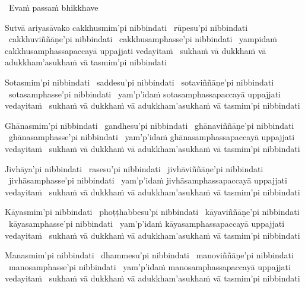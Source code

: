 \begin{pali-leader}
  \anglebracketleft\ \hspace{-0.5mm}Evaṁ passaṁ bhikkhave \hspace{-0.5mm}\anglebracketright\
\end{pali-leader}
\begin{pali-hangtogether}
  Sutvā ariyasāvako cakkhusmim'pi nibbindati \breathmark\ rūpesu'pi nibbindati \breathmark\ cakkhuviññāṇe'pi nibbindati \breathmark\ cakkhusamphasse'pi nibbindati \breathmark\ yampidaṁ cakkhusamphassapaccayā uppajjati vedayitaṁ \breathmark\ sukhaṁ vā dukkhaṁ vā adukkham'asukhaṁ vā tasmim'pi nibbindati
\end{pali-hangtogether}

\begin{pali-hang}
  Sotasmim'pi nibbindati \breathmark\ saddesu'pi nibbindati \breathmark\ sotaviññāṇe'pi nibbindati \breathmark\ sotasamphasse'pi nibbindati \breathmark\ yam'p'idaṁ sotasamphassapaccayā uppajjati vedayitaṁ \breathmark\ sukhaṁ vā dukkhaṁ vā adukkham'asukhaṁ vā tasmim'pi nibbindati
\end{pali-hang}

\begin{pali-hang}
  Ghānasmim'pi nibbindati \breathmark\ gandhesu'pi nibbindati \breathmark\ ghānaviññāṇe'pi nibbindati \breathmark\ ghānasamphasse'pi nibbindati \breathmark\ yam'p'idaṁ ghānasamphassapaccayā uppajjati vedayitaṁ \breathmark\ sukhaṁ vā dukkhaṁ vā adukkham'asukhaṁ vā tasmim'pi nibbindati
\end{pali-hang}

\begin{pali-hang}
  Jivhāya'pi nibbindati \breathmark\ rasesu'pi nibbindati \breathmark\ jivhāviññāṇe'pi nibbindati \breathmark\ jivhāsamphasse'pi nibbindati \breathmark\ yam'p'idaṁ jivhāsamphassapaccayā uppajjati vedayitaṁ \breathmark\ sukhaṁ vā dukkhaṁ vā adukkham'asukhaṁ vā tasmim'pi nibbindati
\end{pali-hang}

\begin{pali-hang}
  Kāyasmim'pi nibbindati \breathmark\ phoṭṭhabbesu'pi nibbindati \breathmark\ kāyaviññāṇe'pi nibbindati \breathmark\ kāyasamphasse'pi nibbindati \breathmark\ yam'p'idaṁ kāyasamphassapaccayā uppajjati vedayitaṁ \breathmark\ sukhaṁ vā dukkhaṁ vā adukkham'asukhaṁ vā tasmim'pi nibbindati
\end{pali-hang}

\begin{pali-hang}
  Manasmim'pi nibbindati \breathmark\ dhammesu'pi nibbindati \breathmark\ manoviññāṇe'pi nibbindati \breathmark\ manosamphasse'pi nibbindati \breathmark\ yam'p'idaṁ manosamphassapaccayā uppajjati vedayitaṁ \breathmark\ sukhaṁ vā dukkhaṁ vā adukkham'asukhaṁ vā tasmim'pi nibbindati
\end{pali-hang}

